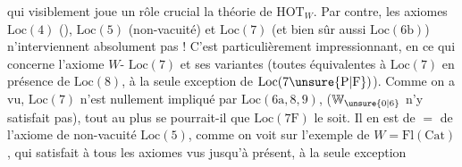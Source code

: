 qui visiblement joue un rôle crucial
 la théorie de $\mathrm{HOT}_{W}$. Par contre,
les axiomes $\mathrm{Loc}(4)$\deleted{\unsure{,}} (),
$\mathrm{Loc}(5)$ (non-vacuité) et $\mathrm{Loc}(7)$
(et bien sûr aussi $\mathrm{Loc}(6\mathrm{b})$) n'interviennent
absolument pas ! C'est particulièrement
impressionnant, en ce qui
concerne l'axiome  $W$-
$\mathrm{Loc}(7)$ et ses variantes (toutes équivalentes
à $\mathrm{Loc}(7)$ en présence de $\mathrm{Loc}(8)$, à la
seule exception de $\mathrm{Loc}(7\unsure{\mathrm{P}|\mathrm{F}})$). Comme
on a vu, $\mathrm{Loc}(7)$ n'est nullement impliqué
par $\mathrm{Loc}(6\mathrm{a},8,9)$,  ($\mathbb{W}_{\unsure{0|6}}$ n'y
satisfait pas), tout au plus se pourrait-il
que $\mathrm{Loc}(7\mathrm{F})$ le soit. Il en
est de $=$ de l'axiome de non-vacuité
$\mathrm{Loc}(5)$, comme on voit sur l'exemple
de $W=\mathrm{Fl}(\mathrm{Cat})$, qui satisfait à tous les
axiomes vus jusqu'à présent, à la seule exception
